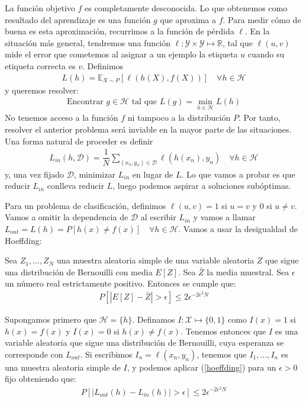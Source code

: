 La función objetivo $f$ es completamente desconocida. Lo que obtenemos como resultado del aprendizaje es una función $g$ que aproxima a $f$. Para medir cómo de buena es esta aproximación, recurrimos a la función de pérdida $\ell$.
En la situación más general, tendremos una función $\ell: \mathcal{Y} \times \mathcal{Y} \mapsto \mathbb{R}$, tal que $\ell(u, v)$ mide el error que cometemos al asignar a un ejemplo la etiqueta $u$ cuando su etiqueta correcta es $v$. Definimos 
\begin{gather*}
	L(h) = \mathbb{E}_{X \sim P}[\ell(h(X), f(X))] \quad \forall h \in \mathcal{H}
\end{gather*}
y queremos resolver:
\begin{gather*}
	\text{Encontrar $g \in \mathcal{H}$ tal que } L(g) = \min_{h \in \mathcal{H}} L(h)
\end{gather*}
No tenemos acceso a la función $f$ ni tampoco a la distribución $P$. Por tanto, resolver el anterior problema será inviable en la mayor parte de las situaciones. Una forma natural de proceder es definir 
\begin{gather*}
	L_{in}(h, \mathcal{D}) =  \dfrac{1}{N}\sum_{(x_n, y_n) \in \mathcal{D}} \ell(h(x_n), y_n) \quad  \forall h \in \mathcal{H}
\end{gather*}
y, una vez fijado $\mathcal{D}$, minimizar $L_{in}$ en lugar de $L$. Lo que vamos a probar es que reducir $L_{in}$ conlleva reducir $L$, luego podemos aspirar a soluciones subóptimas.

Para un problema de clasificación, definimos $\ell(u,v)=1$ si $u=v$ y $0$ si $u\neq v$. Vamos a omitir la dependencia de $\mathcal{D}$ al escribir $L_{in}$ y vamos a llamar $L_{out} = L(h) = P[h(x) \neq f(x)] \quad \forall h \in \mathcal{H}$. Vamos a usar la desigualdad de Hoeffding:

\begin{lemma}\label{hoeffding}
	Sea $Z_1, \ldots, Z_N$ una muestra aleatoria simple de una variable aleatoria $Z$ que sigue una distribución de Bernouilli con media $E[Z]$. Sea $\bar{Z}$ la media muestral. Sea $\epsilon$ un número real estrictamente positivo. Entonces se cumple que:
	\begin{align}
		P[ |E[Z] - \bar{Z}| > \epsilon  ] \leq 2 \epsilon^{-2 \epsilon^2 N}
	\end{align}
\end{lemma}

Supongamos primero que $\mathcal{H} = \{ h \}$. Definamos $I: \mathcal{X} \mapsto \{0,1\}$ como $I(x)=1$ si $h(x) = f(x)$ y $I(x) = 0$ si $h(x) \neq f(x)$. Tenemos entonces que $I$ es una variable aleatoria que sigue una distribución de Bernouilli, cuya esperanza se corresponde con $L_{out}$. Si escribimos $I_n=\ell(x_n, y_n)$, tenemos que $I_1, \ldots, I_n$ es una muestra aleatoria simple de $I$, y podemos aplicar (\ref{hoeffding}) para un $\epsilon > 0$ fijo obteniendo que:
\begin{align*}
	P[ |L_{out}(h) - L_{in}(h)| > \epsilon  ] \leq 2 \epsilon^{-2 \epsilon^2 N}
\end{align*}

